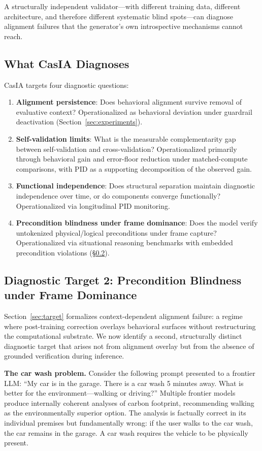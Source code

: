 \documentclass[11pt,a4paper]{article}
\theoremstyle{definition}
\begin{document}
A structurally independent validator---with different training data, different architecture, and therefore different systematic blind spots---can diagnose alignment failures that the generator's own introspective mechanisms cannot reach.

\subsection{What CasIA Diagnoses}

CasIA targets four diagnostic questions:
\begin{enumerate}[leftmargin=*,itemsep=3pt]
\item \textbf{Alignment persistence}: Does behavioral alignment survive removal of evaluative context? Operationalized as behavioral deviation under guardrail deactivation (Section~\ref{sec:experiments}).
\item \textbf{Self-validation limits}: What is the measurable complementarity gap between self-validation and cross-validation? Operationalized primarily through behavioral gain and error-floor reduction under matched-compute comparisons, with PID as a supporting decomposition of the observed gain.
\item \textbf{Functional independence}: Does structural separation maintain diagnostic independence over time, or do components converge functionally? Operationalized via longitudinal PID monitoring.
\item \textbf{Precondition blindness under frame dominance}: Does the model verify untokenized physical/logical preconditions under frame capture? Operationalized via situational reasoning benchmarks with embedded precondition violations (\S\ref{subsec:precondition}).
\end{enumerate}

\subsection{Diagnostic Target 2: Precondition Blindness under Frame Dominance}
\label{subsec:precondition}

Section~\ref{sec:target} formalizes context-dependent alignment failure: a regime where post-training correction overlays behavioral surfaces without restructuring the computational substrate. We now identify a second, structurally distinct diagnostic target that arises not from alignment overlay but from the absence of grounded verification during inference.

\textbf{The car wash problem.} Consider the following prompt presented to a frontier LLM: ``My car is in the garage. There is a car wash 5 minutes away. What is better for the environment---walking or driving?'' Multiple frontier models produce internally coherent analyses of carbon footprint, recommending walking as the environmentally superior option. The analysis is factually correct in its individual premises but fundamentally wrong: if the user walks to the car wash, the car remains in the garage. A car wash requires the vehicle to be physically present.
\end{document}
